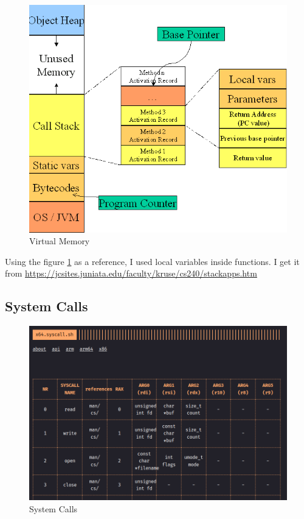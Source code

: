 \documentclass{article}
\begin{document}
\begin{figure}[H]
    \centering
    \includegraphics[width=\textwidth]{vm.png}
    \caption{Virtual Memory}
    \label{fig:vm}
\end{figure}

Using the figure \ref{fig:vm} as a reference, I used local variables inside functions. I get it from \url{https://jcsites.juniata.edu/faculty/kruse/cs240/stackapps.htm}

\subsection{System Calls}

\begin{figure}[H]
    \centering
    \includegraphics[width=\textwidth]{syscalls.png}
    \caption{System Calls}
    \label{fig:syscalls}
\end{figure}
\end{document}
